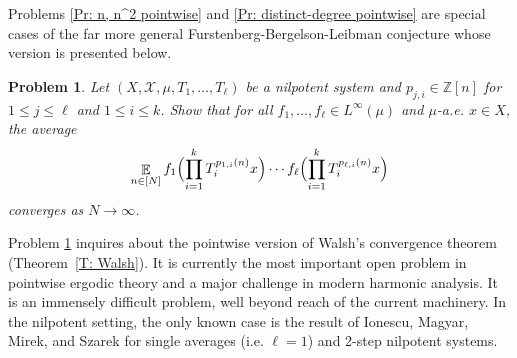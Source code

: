 \documentclass[11pt]{amsart}
\newtheorem{problem}{Problem}
\theoremstyle{definition}
\DeclareMathOperator*{\E}{\mathbb{E}}
\newcommand{\N}{{\mathbb N}}
\newcommand{\Z}{{\mathbb Z}}
\newcommand{\CX}{{\mathcal X}}
\newcommand{\1}{{\mathbf{1}}}
\newcommand{\Bigbrac}[1]{\Bigl( #1 \Bigr)}
\begin{document}
Problems \ref{Pr: n, n^2 pointwise} and \ref{Pr: distinct-degree pointwise} are special cases of the far more general Furstenberg-Bergelson-Leibman conjecture whose version is presented below.
\begin{problem}\label{Pr: FBL}
Let $(X, \mathcal{X}, \mu, T_1,\ldots, T_\ell)$ be a nilpotent system and $p_{j,i} \in \Z[n]$ for $1\leq j\leq\ell$ and $1\leq i\leq k$. 
Show that for all $f_1, \ldots, f_\ell \in L^\infty(\mu)$ and $\mu$-a.e. $x\in X$, the average
\[ \E_{n\in [N]} f_1\Bigbrac{\prod_{i=1}^k T_i^{p_{1,i}(n)}x}\cdots f_\ell\Bigbrac{\prod_{i=1}^k T_i^{p_{\ell,i}(n)}x}\]
converges as $N\to\infty$.
\end{problem}
Problem \ref{Pr: FBL} inquires about the pointwise version of Walsh's convergence theorem (Theorem~\ref{T: Walsh}). It is currently the most important open problem in pointwise ergodic theory and a major challenge in modern harmonic analysis. It is an immensely difficult problem, well beyond reach of the current machinery.
In the nilpotent setting, the only known case is the result of Ionescu, Magyar, Mirek, and Szarek  \cite{IMMS23} for single averages (i.e. $\ell=1$) and 2-step nilpotent systems. 
\end{document}
